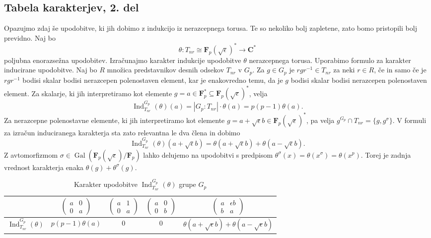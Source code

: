 \documentclass[11pt]{book}
\def\CC{\mathbf{C}}
\def\FF{\mathbf{F}}
\DeclareMathOperator\Ind{Ind}
\DeclareMathOperator\Gal{Gal}
\newcommand{\mat}[4]{\left(\begin{smallmatrix}#1&#2\\#3&#4\end{smallmatrix}\right)}
\theoremstyle{definition}
\theoremstyle{zgled}
\theoremstyle{zgledbrezstevilke}
\theoremstyle{odprtproblem}
\theoremstyle{domacanaloga}
\theoremstyle{izrek}
\begin{document}
\subsection{Tabela karakterjev, 2. del}

Opazujmo zdaj še upodobitve, ki jih dobimo z indukcijo iz nerazcepnega torusa. Te so nekoliko bolj zapletene, zato bomo pristopili bolj previdno. Naj bo
\[
    \theta \colon T_{nr} \cong \FF_p(\sqrt{\epsilon})^* \to \CC^*
\]
poljubna enorazsežna upodobitev. Izračunajmo karakter indukcije upodobitve $\theta$ nerazcepnega torusa. Uporabimo formulo za karakter inducirane upodobitve. Naj bo $R$ množica predstavnikov desnih odsekov $T_{nr}$ v $G_p$. Za $g \in G_p$ je $r g r^{-1} \in T_{nr}$ za neki $r \in R$, če in samo če je $r g r^{-1}$ bodisi skalar bodisi nerazcepen polenostaven element, kar je enakovredno temu, da je $g$ bodisi skalar bodisi nerazcepen polenostaven element. Za skalarje, ki jih interpretiramo kot elemente $g = a \in \FF_p^* \subseteq \FF_p(\sqrt{\epsilon})^*$, velja
\[
    \textstyle \Ind_{T_{nr}}^{G_p}(\theta)(a) = |G_p : T_{nr}| \cdot \theta(a) = p(p-1) \theta(a).
\]
Za nerazcepne polenostavne elemente, ki jih interpretiramo kot elemente $g = a + \sqrt{\epsilon} b \in \FF_p(\sqrt{\epsilon})^*$, pa velja $g^{G_p} \cap T_{nr} = \{ g, g^{\sigma} \}$. V formuli za izračun induciranega karakterja sta zato relevantna le dva člena in dobimo
\[
    \textstyle \Ind_{T_{nr}}^{G_p}(\theta)(a + \sqrt{\epsilon} b) = \theta(a + \sqrt{\epsilon} b) + \theta(a - \sqrt{\epsilon} b).
\]
Z avtomorfizmom $\sigma \in \Gal(\FF_p(\sqrt{\epsilon})/\FF_p)$ lahko delujemo na upodobitvi s predpisom $\theta^\sigma(x) = \theta(x^\sigma) = \theta(x^p)$. Torej je zadnja vrednost karakterja enaka $\theta(g) + \theta^\sigma(g)$.

\begin{table}[ht]
    \centering
\begin{tabular}{l|*{4}{c}}
    & 
    $\mat{a}{0}{0}{a}$
    &
    $\mat{a}{1}{0}{a}$
    &
    $\mat{a}{0}{0}{b}$
    &
    $\mat{a}{\epsilon b}{b}{a}$ \\ \hline
    $\Ind_{T_{nr}}^{G_p}(\theta)$ & $p(p-1) \theta(a)$ & $0$ & $0$ & $\theta(a + \sqrt{\epsilon}b) + \theta(a - \sqrt{\epsilon}b)$ \\
\end{tabular}
\caption{Karakter upodobitve $\Ind_{T_{nr}}^{G_p}(\theta)$ grupe $G_p$}
\end{table}
\end{document}

